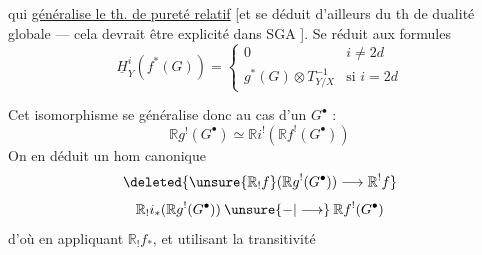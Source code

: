 qui \uline{généralise le th. de pureté relatif}
[et se déduit d'ailleurs du th de dualité globale --- cela devrait être explicité dans SGA ].
Se réduit aux formules
\[
\underline H^i_Y(f^*(G))=
\begin{cases}
0 & i\ne2d\\
g^*(G)\otimes T_{Y/X}^{-1} & \text{si }i=2d
\end{cases}
\]

Cet isomorphisme se généralise donc au cas d'un $G^\bullet$ :
\[
\mathbb{R}g^!(G^\bullet)\simeq \mathbb{R}i^!(\mathbb{R}f^!(G^\bullet))
\]
On en déduit un hom canonique
\[
\deleted{\unsure{\mathbb{R}_!f}(\mathbb{R}g^!(G^\bullet))\longrightarrow \mathbb{R}^!f}
\]
\[
\mathbb{R}_!i_*(\mathbb{R}g^!(G^\bullet))\mathbin{\unsure{-|\longrightarrow}}\mathbb{R}f^!(G^\bullet)
\]
d'où en appliquant $\mathbb{R}_!f_*$, et utilisant la transitivité
